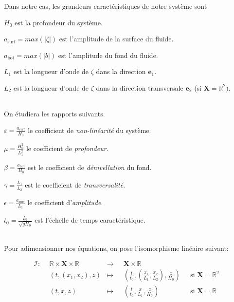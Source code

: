\documentclass[12pt,a4paper]{article}
\numberwithin{equation}{section}
\begin{document}
Dans notre cas, les grandeurs caractéristiques de notre système sont

\begin{list}{\textbullet}{}
    \item $H_0$ est la profondeur du système.
    \item $a_{\text{surf}} = max(|\zeta|)$ est l'amplitude de la surface du fluide.
    \item $a_{\text{bot}} = max(|b|)$ est l'amplitude du fond du fluide.
    \item $L_1$ est la longueur d'onde de $\zeta$ dans la direction $\textbf{e}_1$.
    \item $L_2$ est la longueur d'onde de $\zeta$ dans la direction transversale $\textbf{e}_2$ (si $\textbf{X} = \mathbb{R}^2)$.
    
 \end{list}
\,
\\

On étudiera les rapports suivants.

\begin{list}{\textbullet}{}
    \item $\varepsilon = \frac{a_{\text{surf}}}{H_0}$ le coefficient de \textit{non-linéarité} du système.
    \item $\mu =\frac{H_0^2}{L_1^2}$ le coefficient de \textit{profondeur}.
    \item $\beta = \frac{a_{\text{bot}}}{H_0}$ est le coefficient de \textit{dénivellation} du fond.
    \item $\gamma = \frac{L_1}{L_2}$ est le coefficient de \textit{transversalité}.
    \item $\epsilon = \frac{ a_{\text{surf}}}{L_1}$ le coefficient d'\textit{amplitude}.
    \item $t_0 = \frac{L_1}{\sqrt{gH_0}}$ est l'échelle de temps caractéristique.
\end{list}

~\\
Pour adimensionner nos équations, on pose l'isomorphisme linéaire suivant:

  
\begin{equation}
\begin{aligned}
      \mathcal{I}:~~&\mathbb{R}\times\textbf{X}\times\mathbb{R} &\longrightarrow ~~~ &\textbf{X}\times \mathbb{R} & \\
      &(t,(x_1,x_2),z) &\longmapsto &\left(\frac{t}{t_0},\left(\frac{x_1}{L_1},\frac{x_2}{L_2} \right),\frac{z}{H_0}\right) ~~~&\text{si }\textbf{X}=\mathbb{R}^2\\
      &(t, x ,z) &\longmapsto &\left(\frac{t}{t_0},\frac{x}{L_1},\frac{z}{H_0}\right) ~~~&\text{si }   \textbf{X}=\mathbb{R}
\end{aligned}
\end{equation}
\end{document}
